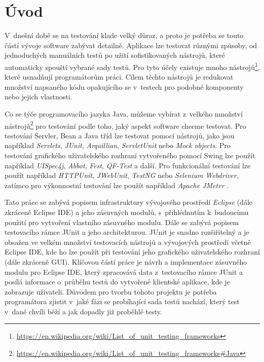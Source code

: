 \chapter{Úvod}                                                            %
V~dnešní době se na testování klade velký důraz, a proto je potřeba se touto částí vývoje software zabývat detailně. Aplikace lze testovat různými způsoby, od jednoduchých manuálních testů po užití sofistikovaných nástrojů, které automaticky spouští vybrané sady testů. Pro tyto účely existuje mnoho nástrojů\footnote{\url{https://en.wikipedia.org/wiki/List_of_unit_testing_frameworks}}, které usnadňují programátorům práci. Cílem těchto nástrojů je redukovat množství napsaného kódu opakujícího se v~testech pro podobné komponenty nebo jejich vlastnosti.

Co se týče programovacího jazyka Java, můžeme vybírat z~velkého množství nástrojů\footnote{\url{https://en.wikipedia.org/wiki/List_of_unit_testing_frameworks\#Java}} pro testování podle toho, jaký aspekt software chceme testovat. Pro testování Servler, Bean a Java tříd lze testovat pomocí nástrojů, jako jsou například \emph{Servlets}, \emph{JUnit}, \emph{Arquillian}, \emph{ServletUnit} nebo \emph{Mock objects}. Pro testování grafického uživatelského rozhraní vytvořeného pomocí Swing lze použít například \emph{UISpec4j}, \emph{Abbot}, \emph{Fest}, \emph{QF-Test} a další. Pro funkcionální testování lze použít například \emph{HTTPUnit}, \emph{JWebUnit}, \emph{TestNG} nebo \emph{Selenium Webdriver}, zatímco pro výkonnostní testování lze použít například \emph{Apache JMeter} \cite{softwaretestinghelp}.

Tato práce se zabývá popisem infrastruktury vývojového prostředí \emph{Eclipse} (dále zkráceně Eclipse IDE) a jeho zásuvných modulů, s~přihlédnutím k~budoucímu použití pro vytvoření vlastního zásuvného modulu. Dále se zabývá popisem testovacího rámce JUnit a jeho architekturou. JUnit je snadno rozšiřitelný a je obsažen ve velkém množství testovacích nástrojů a vývojových prostředí včetně Eclipse IDE, kde ho lze použít při testování jeho grafického uživatelského rozhraní (dále zkráceně GUI). Klíčovou částí práce je návrh a implementace zásuvného modulu pro Eclipse IDE, který zpracovává data z~testovacího rámce JUnit a posílá informace o~průběhu testů do vytvořené klientské aplikace, kde je zobrazuje uživateli. Důvodem pro tvorbu tohoto projektu je potřeba programátora zjistit v~jaké fázi se probíhající sada testů nachází, který test v~dané chvíli běží a jak dopadly již proběhlé testy.

